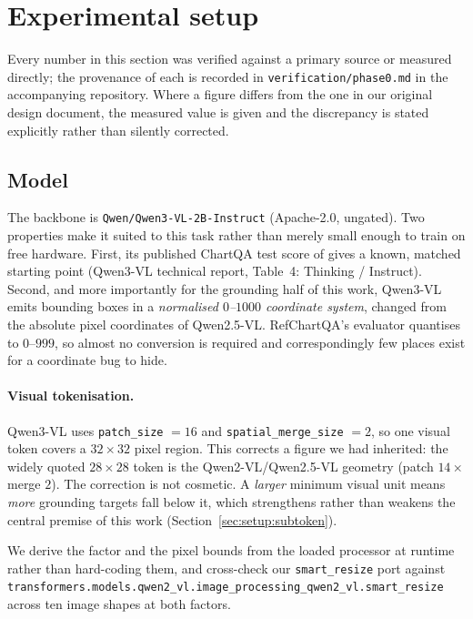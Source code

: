 \section{Experimental setup}
\label{sec:setup}

Every number in this section was verified against a primary source or measured directly; the
provenance of each is recorded in \texttt{verification/phase0.md} in the accompanying repository.
Where a figure differs from the one in our original design document, the measured value is given and
the discrepancy is stated explicitly rather than silently corrected.

\subsection{Model}
\label{sec:setup:model}

The backbone is \texttt{Qwen/Qwen3-VL-2B-Instruct} (Apache-2.0, ungated). Two properties make it
suited to this task rather than merely small enough to train on free hardware. First, its published
ChartQA test score of  gives a known, matched starting point
(Qwen3-VL technical report, Table~4:  Thinking /  Instruct). Second, and
more importantly for the grounding half of this work, Qwen3-VL emits bounding boxes in a
\emph{normalised $0$--$1000$ coordinate system}, changed from the absolute pixel coordinates of
Qwen2.5-VL. RefChartQA's evaluator quantises to $0$--$999$, so almost no conversion is required and
correspondingly few places exist for a coordinate bug to hide.

\paragraph{Visual tokenisation.}
Qwen3-VL uses \texttt{patch\_size} $=16$ and \texttt{spatial\_merge\_size} $=2$, so one visual token
covers a $32\times32$ pixel region. This corrects a figure we had inherited: the widely quoted
$28\times28$ token is the Qwen2-VL/Qwen2.5-VL geometry (patch $14\times$ merge $2$). The correction
is not cosmetic. A \emph{larger} minimum visual unit means \emph{more} grounding targets fall below
it, which strengthens rather than weakens the central premise of this work
(Section~\ref{sec:setup:subtoken}).

We derive the factor and the pixel bounds from the loaded processor at runtime rather than
hard-coding them, and cross-check our \texttt{smart\_resize} port against
\texttt{transformers.models.qwen2\_vl.image\_processing\_qwen2\_vl.smart\_resize} across ten image
shapes at both factors.


